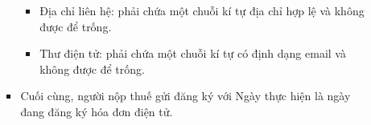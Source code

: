 \begin{itemize}
\begin{itemize}
\begin{itemize}
\begin{note}
\begin{itemize}

                                      \item Địa chỉ liên hệ: phải chứa một chuỗi kí tự địa chỉ hợp lệ  và không được để trống.


                                      \item Thư điện tử: phải chứa một chuỗi kí tự có định dạng email và không được để trống.


                                  \end{itemize}

                              \end{note}

                        \item Cuối cùng, người nộp thuế gửi đăng ký với Ngày thực hiện là ngày đang đăng ký hóa đơn điện tử.


                    \end{itemize}

          \end{itemize}

\end{itemize}








